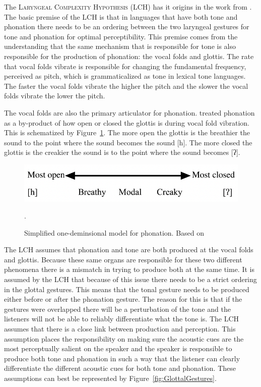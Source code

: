 \documentclass[12pt, letterpaper]{article}
\begin{document}
The \textsc{Laryngeal Complexity Hypothesis} (LCH) has it origins in the work from \citet{silvermanLaryngealComplexityOtomanguean1997,blankenshipTimeCourseBreathiness1997,blankenshipTimingNonmodalPhonation2002}. The basic premise of the LCH is that in languages that have both tone and phonation there needs to be an ordering between the two laryngeal gestures for tone and phonation for optimal perceptibility. This premise comes from the understanding that the same mechanism that is responsible for tone is also responsible for the production of phonation: the vocal folds and glottis. The rate that vocal folds vibrate is responsible for changing the fundamental frequency, perceived as pitch, which is grammaticalized as tone in lexical tone languages. The faster the vocal folds vibrate the higher the pitch and the slower the vocal folds vibrate the lower the pitch. 

The vocal folds are also the primary articulator for phonation. \citet{ladefogedPreliminariesLinguisticPhonetics1971,gordonPhonationTypesCrosslinguistic2001} treated phonation as a by-product of how open or closed the glottis is during vocal fold vibration. This is schematized by Figure~\ref{fig:Phonation}. The more open the glottis is the breathier the sound to the point where the sound becomes the sound [h]. The more closed the glottis is the creakier the sound is to the point where the sound becomes [ʔ]. 
\begin{figure}[!ht]
	\centering
	\includegraphics[width=.6\textwidth]{../Phonation.png}
	\caption{Simplified one-deminsional model for phonation. Based on \citet{ladefogedPreliminariesLinguisticPhonetics1971,gordonPhonationTypesCrosslinguistic2001}}.
	\label{fig:Phonation}
\end{figure}
\vspace{-2ex}

The LCH assumes that phonation and tone are both produced at the vocal folds and glottis. Because these same organs are responsible for these two different phenomena there is a mismatch in trying to produce both at the same time. It is assumed by the LCH that because of this issue there needs to be a strict ordering in the glottal gestures. This means that the tonal gesture needs to be produced either before or after the phonation gesture. The reason for this is that if the gestures were overlapped there will be a perturbation of the tone and the listeners will not be able to reliably differentiate what the tone is. The LCH assumes that there is a close link between production and perception. This assumption places the responsibility on making sure the acoustic cues are the most perceptually salient on the speaker and the speaker is responsible to produce both tone and phonation in such a way that the listener can clearly differentiate the different acoustic cues for both tone and phonation. These assumptions can best be represented by Figure~\ref{fig:GlottalGestures}. 
\end{document}
